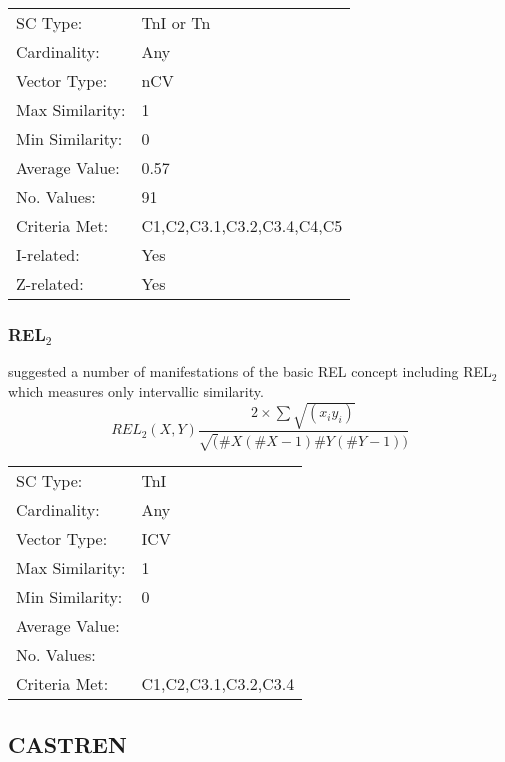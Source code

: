 \documentclass{article}
\begin{document}
\begin{center}
\begin{tabular}{ll}
 SC Type:         &  TnI or Tn                   \\
 Cardinality:     &  Any                         \\
 Vector Type:     &  nCV                         \\
 Max Similarity:  &  1                           \\
 Min Similarity:  &  0                           \\
 Average Value:   &  0.57                        \\
 No. Values:      &  91                          \\
 Criteria Met:    &  C1,C2,C3.1,C3.2,C3.4,C4,C5  \\
 I-related:       &  Yes                         \\
 Z-related:       &  Yes                         \\
\end{tabular}
\end{center}
\subsubsection{REL$_{2}$}
\label{sec-11-7-2}

\citet{Rahn1979} suggested a number of manifestations of the basic REL
concept including REL$_{2}$ which measures only intervallic similarity.
$$ REL_{2}(X,Y)\frac{2\times\sum\sqrt{(x_{i}y_{i})}}{\sqrt(\#X(\#X-1)\#Y(\#Y-1))} $$

\begin{center}
\begin{tabular}{ll}
 SC Type:         &  TnI                   \\
 Cardinality:     &  Any                   \\
 Vector Type:     &  ICV                   \\
 Max Similarity:  &  1                     \\
 Min Similarity:  &  0                     \\
 Average Value:   &                        \\
 No. Values:      &                        \\
 Criteria Met:    &  C1,C2,C3.1,C3.2,C3.4  \\
\end{tabular}
\end{center}
\subsection{CASTREN}
\label{sec-11-8}
\end{document}
